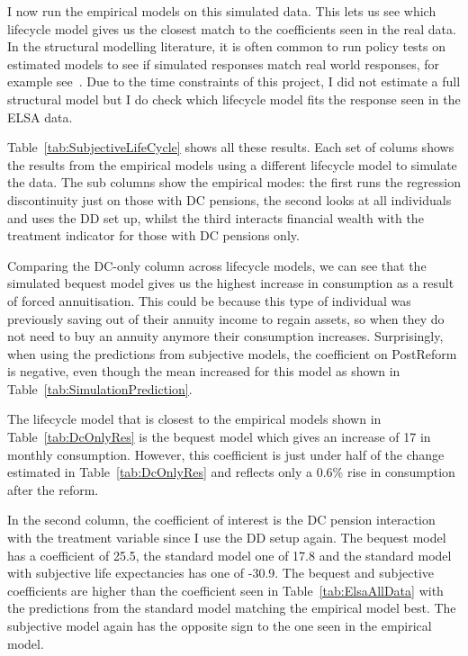 \documentclass[12pt]{article}
\begin{document}
I now run the empirical models on this simulated data. This lets us see which
lifecycle model gives us the closest match to the coefficients seen in the real
data. In the structural modelling literature, it is often common to run policy
tests on estimated models to see if simulated responses match real world
responses, for example see~\cite{mcgee-2021}. Due to the time constraints of
this project, I did not estimate a full structural model but I do check which
lifecycle model fits the response seen in the ELSA data.


\begin{landscape}
  \linespread{1.5}
  
\end{landscape}


Table~\ref{tab:SubjectiveLifeCycle} shows all these results. Each set of colums shows the
results from the empirical models using a different lifecycle model to simulate
the data. The sub columns show the empirical modes: the first runs the
regression discontinuity just on those with DC pensions, the second looks at
all individuals and uses the DD set up, whilst the third interacts financial
wealth with the treatment indicator for those with DC pensions only.

Comparing the DC-only column across lifecycle models, we can see that the
simulated bequest model gives us the highest increase in consumption as a result
of forced annuitisation. This could be because this type of individual was
previously saving out of their annuity income to regain assets, so when they do
not need to buy an annuity anymore their consumption increases. Surprisingly,
when using the predictions from subjective models, the coefficient on PostReform
is negative, even though the mean increased for this model as shown in Table~\ref{tab:SimulationPrediction}.

The lifecycle model that is closest to the empirical models shown in Table~\ref{tab:DcOnlyRes} is the bequest model which gives an increase of 17 in monthly consumption.
However, this coefficient is just under half of the change estimated in Table~\ref{tab:DcOnlyRes} and reflects only a 0.6\% rise in consumption after the reform.

In the second column, the coefficient of interest is the DC pension interaction
with the treatment variable since I use the DD setup again. The bequest model
has a coefficient of 25.5, the standard model one of 17.8 and the standard model
with subjective life expectancies has one of -30.9. The bequest and subjective
coefficients are higher than the coefficient seen in Table~\ref{tab:ElsaAllData}
with the predictions from the standard model matching the empirical model best.
The subjective model again has the opposite sign to the one seen in the
empirical model.
\end{document}
